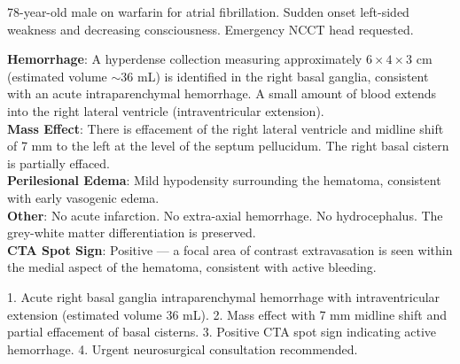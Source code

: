 \begin{testbox}[Indications:]
78-year-old male on warfarin for atrial fibrillation. Sudden onset left-sided weakness and decreasing consciousness. Emergency NCCT head requested.
\end{testbox}
\begin{refbox}[Findings:]
\textbf{Hemorrhage}: A hyperdense collection measuring approximately $6 \times 4 \times 3$ cm (estimated volume $\sim$36 mL) is identified in the right basal ganglia, consistent with an acute intraparenchymal hemorrhage. A small amount of blood extends into the right lateral ventricle (intraventricular extension).\\
\textbf{Mass Effect}: There is effacement of the right lateral ventricle and midline shift of 7 mm to the left at the level of the septum pellucidum. The right basal cistern is partially effaced.\\
\textbf{Perilesional Edema}: Mild hypodensity surrounding the hematoma, consistent with early vasogenic edema.\\
\textbf{Other}: No acute infarction. No extra-axial hemorrhage. No hydrocephalus. The grey-white matter differentiation is preserved.\\
\textbf{CTA Spot Sign}: Positive --- a focal area of contrast extravasation is seen within the medial aspect of the hematoma, consistent with active bleeding.
\end{refbox}
\begin{pearlbox}[Impression:]
1. Acute right basal ganglia intraparenchymal hemorrhage with intraventricular extension (estimated volume 36 mL).
2. Mass effect with 7 mm midline shift and partial effacement of basal cisterns.
3. Positive CTA spot sign indicating active hemorrhage.
4. Urgent neurosurgical consultation recommended.
\end{pearlbox}

\clearpage
